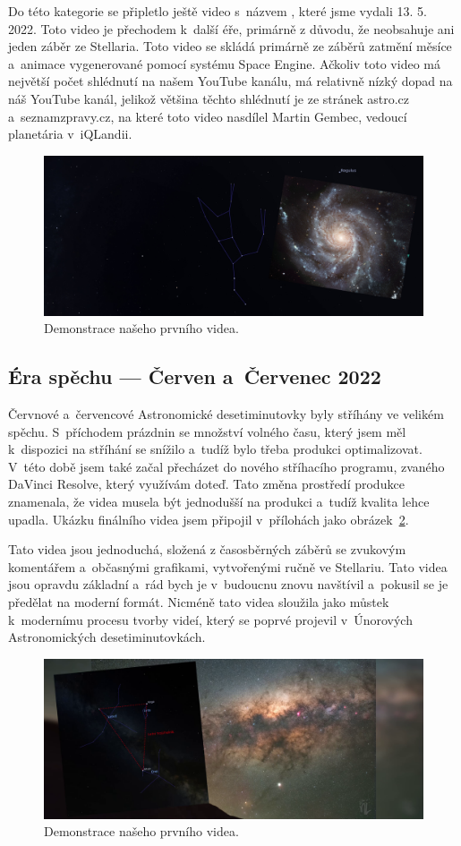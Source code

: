 \documentclass[12pt,a4paper,titlepage]{article}
\begin{document}
Do této kategorie se připletlo ještě video s~názvem , které jsme vydali 13. 5. 2022. Toto video je přechodem k~další éře, primárně z důvodu, že neobsahuje ani jeden záběr ze Stellaria. Toto video se skládá primárně ze záběrů zatmění měsíce a~animace vygenerované pomocí systému Space Engine. Ačkoliv toto video má největší počet shlédnutí na našem YouTube kanálu, má relativně nízký dopad na náš YouTube kanál, jelikož většina těchto shlédnutí je ze stránek astro.cz a~seznamzpravy.cz, na které toto video nasdílel Martin Gembec, vedoucí planetária v~iQLandii.
\begin{figure}[ht]
	\centering
	\includegraphics[width=.85\textwidth]{brezen.png}
	\caption{Demonstrace našeho prvního videa.}\label{img:brezen}
\end{figure}
\subsection{Éra spěchu --- Červen a~Červenec 2022}
Červnové a~červencové Astronomické desetiminutovky byly stříhány ve velikém spěchu. S~příchodem prázdnin se množství volného času, který jsem měl k~dispozici na stříhání se snížilo a~tudíž bylo třeba produkci optimalizovat. V~této době jsem také začal přecházet do nového stříhacího programu, zvaného DaVinci Resolve, který využívám doteď. Tato změna prostředí produkce znamenala, že videa musela být jednodušší na produkci a~tudíž kvalita lehce upadla. Ukázku finálního videa jsem připojil v~přílohách jako obrázek~\ref{img:cervenec}.

Tato videa jsou jednoduchá, složená z časosběrných záběrů se zvukovým komentářem a~občasnými grafikami, vytvořenými ručně ve Stellariu. Tato videa jsou opravdu základní a~rád bych je v~budoucnu znovu navštívil a~pokusil se je předělat na moderní formát. Nicméně tato videa sloužila jako můstek k~modernímu procesu tvorby videí, který se poprvé projevil v~Únorových Astronomických desetiminutovkách.

\begin{figure}[ht]
	\centering
	\includegraphics[width=.85\textwidth]{cervenec.png}
	\caption{Demonstrace našeho prvního videa.}\label{img:cervenec}
\end{figure}
\end{document}
